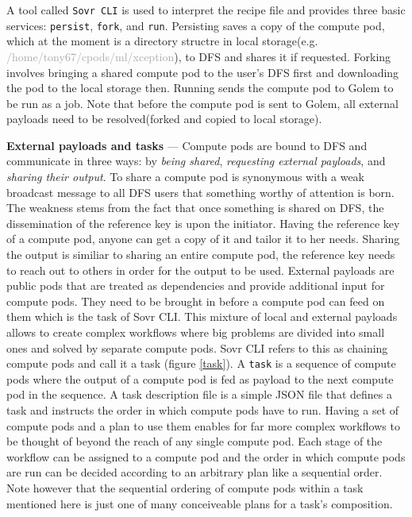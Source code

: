 \documentclass[a4paper, 10pt]{article}
\begin{document}
\par
A tool called \texttt{Sovr CLI} is used to interpret the recipe file and provides three basic services: \texttt{persist}, \texttt{fork}, and \texttt{run}. Persisting saves a copy of the compute pod, which at the moment is a directory structre in local storage(e.g. \textcolor{darkgray}{/home/tony67/cpods/ml/xception}), to DFS and shares it if requested. Forking involves bringing a shared compute pod to the user's DFS first and downloading the pod to the local storage then. Running sends the compute pod to Golem to be run as a job. Note that before the compute pod is sent to Golem, all external payloads need to be resolved(forked and copied to local storage).
\par
\textbf{External payloads and tasks} --- Compute pods are bound to DFS and communicate in three ways: by \textit{being shared}, \textit{requesting external payloads}, and \textit{sharing their output}. To share a compute pod is synonymous with a weak broadcast message to all DFS users that something worthy of attention is born. The weakness stems from the fact that once something is shared on DFS, the dissemination of the reference key is upon the initiator. Having the reference key of a compute pod, anyone can get a copy of it and tailor it to her needs. Sharing the output is similiar to sharing an entire compute pod, the reference key needs to reach out to others in order for the output to be used. External payloads are public pods that are treated as dependencies and provide additional input for compute pods. They need to be brought in before a compute pod can feed on them which is the task of Sovr CLI. This mixture of local and external payloads allows to create complex workflows where big problems are divided into small ones and solved by separate compute pods. Sovr CLI refers to this as chaining compute pods and call it a task (figure  \ref{task}). A \texttt{task} is a sequence of compute pods where the output of a compute pod is fed as payload to the next compute pod in the sequence. A task description file is a simple JSON file that defines a task and instructs the order in which compute pods have to run. Having a set of compute pods and a plan to use them enables for far more complex workflows to be thought of beyond the reach of any single compute pod. Each stage of the workflow can be assigned to a compute pod and the order in which compute pods are run can be decided according to an arbitrary plan like a sequential order. Note however that the sequential ordering of compute pods within a task mentioned here is just one of many conceiveable plans for a task's composition.
\end{document}
